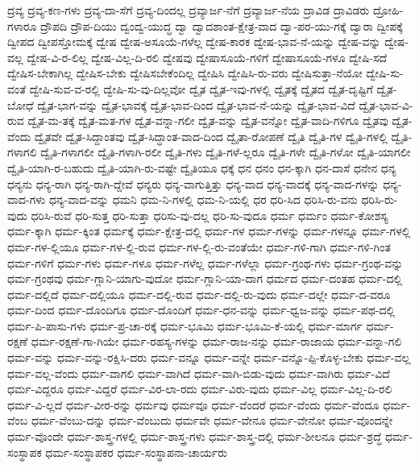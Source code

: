 {ದ್ರವ್ಯ
ದ್ರವ್ಯ-ಕಣ-ಗಳು
ದ್ರವ್ಯ-ದಾ-ಸೆಗೆ
ದ್ರವ್ಯ-ದಿಂದಲ್ಲ
ದ್ರವ್ಯಾರ್ಜ-ನೆಗೆ
ದ್ರವ್ಯಾರ್ಜ-ನೆಯ
ದ್ರಾವಿಡ
ದ್ರಾವಿಡರು
ದ್ರೋಹಿ-ಗಳಾರೂ
ದ್ರೌಪದಿ
ದ್ರೌಪ-ದಿಯು
ದ್ವಂದ್ವ-ಯುದ್ಧ
ದ್ವಾ
ದ್ವಾದಶಾಂತ-ಕ್ಷೇತ್ರ-ವಾದ
ದ್ವಾ-ಪರ-ಯು-ಗಕ್ಕೆ
ದ್ವಾರಾ
ದ್ವೀಪಕ್ಕೆ
ದ್ವೀಪದ
ದ್ವೀಪಸ್ತೋಮಕ್ಕೆ
ದ್ವೇಷ
ದ್ವೇಷ-ಅಸೂಯೆ-ಗಳೆಲ್ಲ
ದ್ವೇಷ-ಕಾರಕ
ದ್ವೇಷ-ಭಾವ-ನೆ-ಯನ್ನು
ದ್ವೇಷ-ವನ್ನು
ದ್ವೇಷ-ವಲ್ಲ
ದ್ವೇಷ-ವಿ-ರ-ಲಿಲ್ಲ
ದ್ವೇಷ-ವಿಲ್ಲ-ದಿ-ರಲಿ
ದ್ವೇಷವು
ದ್ವೇಷಾಸೂಯೆ-ಗಳಿಗೆ
ದ್ವೇಷಾಸೂಯೆ-ಗಳೂ
ದ್ವೇಷಿ-ಸದೆ
ದ್ವೇಷಿಸ-ಬೇಕಾಗಿಲ್ಲ
ದ್ವೇಷಿಸ-ಬೇಕು
ದ್ವೇಷಿಸಬೇಕೆಂದಿಲ್ಲ
ದ್ವೇಷಿಸಿ
ದ್ವೇಷಿಸಿ-ರು-ವರು
ದ್ವೇಷಿಸುತ್ತಾ-ನೆಯೋ
ದ್ವೇಷಿ-ಸು-ವಂತೆ
ದ್ವೇಷಿ-ಸುವ-ವ-ರಲ್ಲಿ
ದ್ವೇಷಿ-ಸು-ವು-ದಿಲ್ಲವೋ
ದ್ವೈತ
ದ್ವೈತ-ಇವು-ಗಳಲ್ಲಿ
ದ್ವೈತಕ್ಕೆ
ದ್ವೈತದ
ದ್ವೈತ-ದೃಷ್ಟಿಗೆ
ದ್ವೈತ-ಬೋಧೆ
ದ್ವೈತ-ಭಾಗ-ವನ್ನು
ದ್ವೈತ-ಭಾವಕ್ಕೆ
ದ್ವೈತ-ಭಾವ-ದಿಂದ
ದ್ವೈತ-ಭಾವ-ನೆ-ಯನ್ನು
ದ್ವೈತ-ಭಾವ-ವಿದೆ
ದ್ವೈತ-ಭಾವ-ವಿ-ರುವ
ದ್ವೈತ-ಮ-ತಕ್ಕೆ
ದ್ವೈತ-ಮತ-ಗಳ
ದ್ವೈತ-ವನ್ನಾ-ಗಲೀ
ದ್ವೈತ-ವನ್ನು
ದ್ವೈತ-ವನ್ನೋ
ದ್ವೈತ-ವಾದಿ-ಗಳಿಗೂ
ದ್ವೈತವು
ದ್ವೈತ-ವೆಂದು
ದ್ವೈತವೇ
ದ್ವೈತ-ಸಿದ್ದಾಂತವು
ದ್ವೈತ-ಸಿದ್ಧಾಂತ-ವಾದ-ದಿಂದ
ದ್ವೈತಾ-ರೋಪಣೆ
ದ್ವೈತಿ
ದ್ವೈತಿ-ಗಳ
ದ್ವೈತಿ-ಗಳಲ್ಲಿ
ದ್ವೈತಿ-ಗಳಾಗಲಿ
ದ್ವೈತಿ-ಗಳಾಗಲೀ
ದ್ವೈತಿ-ಗಳಾಗಿ-ರಲೀ
ದ್ವೈತಿ-ಗಳು
ದ್ವೈತಿ-ಗಳೆ-ಲ್ಲರೂ
ದ್ವೈತಿ-ಗಳೇ
ದ್ವೈತಿ-ಗಳೋ
ದ್ವೈತಿ-ಯಾಗಲೀ
ದ್ವೈತಿ-ಯಾಗಿ-ರ-ಬಹುದು
ದ್ವೈತಿ-ಯಾಗಿ-ರು-ವಷ್ಟೇ
ದ್ವೈತಿಯೂ
ಧಕ್ಕೆ
ಧನ
ಧನಂ
ಧನ-ಕ್ಕಾಗಿ
ಧನ-ದಾಸೆ
ಧನೇನ
ಧನ್ಯ
ಧನ್ಯನು
ಧನ್ಯ-ರಾಗಿ
ಧನ್ಯ-ರಾಗಿ-ದ್ದೇವೆ
ಧನ್ಯರು
ಧನ್ಯ-ವಾಗುತ್ತಿತ್ತು
ಧನ್ಯ-ವಾದ
ಧನ್ಯ-ವಾದಕ್ಕೆ
ಧನ್ಯ-ವಾದ-ಗಳನ್ನು
ಧನ್ಯ-ವಾದ-ಗಳು
ಧನ್ಯ-ವಾದ-ವನ್ನು
ಧಮನಿ
ಧಮ-ನಿ-ಗಳಲ್ಲಿ
ಧಮ-ನಿ-ಯಲ್ಲಿ
ಧರ
ಧರಿ-ಸಿದ
ಧರಿಸಿ-ರು-ವನು
ಧರಿಸಿ-ರು-ವುದು
ಧರಿಸಿ-ರುವೆ
ಧರಿ-ಸುತ್ತ
ಧರಿ-ಸುತ್ತಾ
ಧರಿಸು-ವು-ದಲ್ಲ
ಧರಿ-ಸು-ವುದೂ
ಧರ್ಮ
ಧರ್ಮಂ
ಧರ್ಮ-ಕೋಶಸ್ಯ
ಧರ್ಮ-ಕ್ಕಾಗಿ
ಧರ್ಮ-ಕ್ಕಿಂತ
ಧರ್ಮಕ್ಕೆ
ಧರ್ಮ-ಕ್ಷೇತ್ರ-ದಲ್ಲಿ
ಧರ್ಮ-ಗಳ
ಧರ್ಮ-ಗಳನ್ನು
ಧರ್ಮ-ಗಳನ್ನೂ
ಧರ್ಮ-ಗಳಲ್ಲಿ
ಧರ್ಮ-ಗಳ-ಲ್ಲಿಯೂ
ಧರ್ಮ-ಗಳ-ಲ್ಲಿ-ರುವ
ಧರ್ಮ-ಗಳ-ಲ್ಲಿ-ರು-ವಂತೆಯೇ
ಧರ್ಮ-ಗಳಿ-ಗಾಗಿ
ಧರ್ಮ-ಗಳಿ-ಗಿಂತ
ಧರ್ಮ-ಗಳಿಗೆ
ಧರ್ಮ-ಗಳು
ಧರ್ಮ-ಗಳೂ
ಧರ್ಮ-ಗಳೆಲ್ಲ
ಧರ್ಮ-ಗಳೆಲ್ಲಾ
ಧರ್ಮ-ಗ್ರಂಥ-ಗಳು
ಧರ್ಮ-ಗ್ರಂಥ-ವನ್ನು
ಧರ್ಮ-ಗ್ರಂಥವು
ಧರ್ಮ-ಗ್ಲಾನಿ-ಯಾಗು-ವುದೋ
ಧರ್ಮ-ಗ್ಲಾನಿ-ಯಾ-ದಾಗ
ಧರ್ಮದ
ಧರ್ಮ-ದಂತಹ
ಧರ್ಮ-ದಲ್ಲಿ
ಧರ್ಮ-ದಲ್ಲಿದೆ
ಧರ್ಮ-ದಲ್ಲಿಯೂ
ಧರ್ಮ-ದಲ್ಲಿ-ರುವ
ಧರ್ಮ-ದಲ್ಲಿ-ರು-ವುದು
ಧರ್ಮ-ದಲ್ಲೇ
ಧರ್ಮ-ದ-ವರೂ
ಧರ್ಮ-ದಿಂದ
ಧರ್ಮ-ದೊಂದಿಗೂ
ಧರ್ಮ-ದೊಂದಿಗೆ
ಧರ್ಮ-ಧನ-ವನ್ನು
ಧರ್ಮ-ಧ್ವಜ-ವನ್ನು
ಧರ್ಮ-ಪಥ-ದಲ್ಲಿ
ಧರ್ಮ-ಪಿ-ಪಾಸು-ಗಳು
ಧರ್ಮ-ಪ್ರ-ಚಾ-ರಕ್ಕೆ
ಧರ್ಮ-ಭೂಮಿ
ಧರ್ಮ-ಭೂಮಿ-ಕೆ-ಯಲ್ಲಿ
ಧರ್ಮ-ಮಾರ್ಗ
ಧರ್ಮ-ರಕ್ಷಣೆ
ಧರ್ಮ-ರಕ್ಷಣೆ-ಗಾ-ಗಿಯೇ
ಧರ್ಮ-ರಹಸ್ಯ-ಗಳನ್ನು
ಧರ್ಮ-ರಾಜ-ನನ್ನು
ಧರ್ಮ-ರಾಜಾಯ
ಧರ್ಮ-ವನ್ನಾ-ಗಲಿ
ಧರ್ಮ-ವನ್ನು
ಧರ್ಮ-ವನ್ನು-ರಕ್ಷಿಸಿ-ದರು
ಧರ್ಮ-ವನ್ನೂ
ಧರ್ಮ-ವನ್ನೇ
ಧರ್ಮ-ವನ್ನೊ-ಪ್ಪಿ-ಕೊಳ್ಳ-ಬೇಕು
ಧರ್ಮ-ವಲ್ಲ
ಧರ್ಮ-ವಲ್ಲ-ವೆಂದು
ಧರ್ಮ-ವಾಗಲಿ
ಧರ್ಮ-ವಾಗಿದೆ
ಧರ್ಮ-ವಾಗಿ-ಬಿಡು-ವುದು
ಧರ್ಮ-ವಾಗಿರು
ಧರ್ಮ-ವಿದೆ
ಧರ್ಮ-ವಿದ್ದರೂ
ಧರ್ಮ-ವಿದ್ದರೆ
ಧರ್ಮ-ವಿರ-ಲಾ-ರದು
ಧರ್ಮ-ವಿರು-ವುದು
ಧರ್ಮ-ವಿಲ್ಲ
ಧರ್ಮ-ವಿಲ್ಲ-ದಿ-ರಲಿ
ಧರ್ಮ-ವಿ-ಲ್ಲದೆ
ಧರ್ಮ-ವೀರ-ರನ್ನು
ಧರ್ಮವು
ಧರ್ಮವೂ
ಧರ್ಮ-ವೆಂದರೆ
ಧರ್ಮ-ವೆಂದು
ಧರ್ಮ-ವೆಂದೂ
ಧರ್ಮ-ವೆಂಬ
ಧರ್ಮ-ವೆಂಬು-ದನ್ನು
ಧರ್ಮ-ವೆಂಬುದು
ಧರ್ಮವೇ
ಧರ್ಮ-ವೇನೂ
ಧರ್ಮ-ವೇನೋ
ಧರ್ಮ-ವೊಂದನ್ನೇ
ಧರ್ಮ-ವೊಂದೇ
ಧರ್ಮ-ಶಾಸ್ತ್ರ-ಗಳಲ್ಲಿ
ಧರ್ಮ-ಶಾಸ್ತ್ರ-ಗಳು
ಧರ್ಮ-ಶಾಸ್ತ್ರ-ದಲ್ಲಿ
ಧರ್ಮ-ಶೀಲನೂ
ಧರ್ಮ-ಶ್ರದ್ಧೆ
ಧರ್ಮ-ಸಂಸ್ಥಾಪಕ
ಧರ್ಮ-ಸಂಸ್ಥಾಪಕರ
ಧರ್ಮ-ಸಂಸ್ಥಾಪನಾ-ಚಾರ್ಯರು
}
